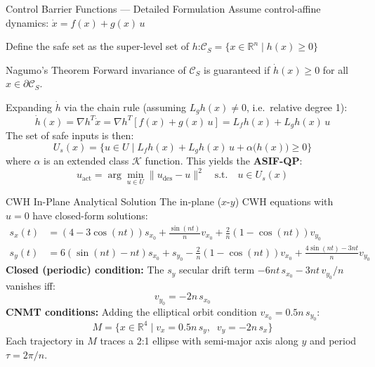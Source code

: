 \begin{frame}{Control Barrier Functions --- Detailed Formulation}
  \hypertarget{backup:cbf-detail}{}
  \small
  Assume control-affine dynamics: $\dot{x} = f(x) + g(x)\,u$

  \vskip4pt
  Define the safe set as the super-level set of $h$:\quad $\mathcal{C}_S = \{x \in \mathbb{R}^n \mid h(x) \geq 0\}$

  \vskip4pt
  \begin{block}{Nagumo's Theorem}
    \vspace{2pt}
    Forward invariance of $\mathcal{C}_S$ is guaranteed if $\dot{h}(x) \geq 0$ for all $x \in \partial\mathcal{C}_S$.
    \vspace{2pt}
  \end{block}

  \vskip4pt
  Expanding $\dot{h}$ via the chain rule (assuming $L_g h(x) \neq 0$, i.e.\ relative degree 1):
  \vskip-6pt
  \[ \dot{h}(x) = \nabla h^T \dot{x} = \nabla h^T [f(x) + g(x)\,u] = L_f h(x) + L_g h(x)\, u \]
  \vskip0pt
  The set of safe inputs is then:
  \vskip-6pt
  \[ U_s(x) = \{u \in U \mid L_f h(x) + L_g h(x)\, u + \alpha\big(h(x)\big) \geq 0\} \]
  \vskip0pt
  where $\alpha$ is an extended class $\mathcal{K}$ function. This yields the \textbf{ASIF-QP}:
  \vskip-6pt
  \[ u_{\text{act}} = \arg\min_{u \in U} \| u_{\text{des}} - u \|^2 \quad \text{s.t.} \quad u \in U_s(x) \]

\end{frame}

\begin{frame}{CWH In-Plane Analytical Solution}
  \hypertarget{backup:cwh-solution}{}
  \footnotesize
  The in-plane ($x$-$y$) CWH equations with $u = 0$ have closed-form solutions:
  \vskip-4pt
  \scriptsize
  \begin{align*}
    s_x(t) &= \left(4 - 3\cos(nt)\right) s_{x_0} + \frac{\sin(nt)}{n} v_{x_0} + \frac{2}{n}\left(1 - \cos(nt)\right) v_{y_0} \\
    s_y(t) &= 6\left(\sin(nt) - nt\right) s_{x_0} + s_{y_0} - \frac{2}{n}\left(1 - \cos(nt)\right) v_{x_0} + \frac{4\sin(nt) - 3nt}{n} v_{y_0}
  \end{align*}
  \vskip0pt
  \footnotesize
  \textbf{Closed (periodic) condition:} The $s_y$ secular drift term $-6nt\, s_{x_0} - 3nt\, v_{y_0}/n$ vanishes iff:
  \vskip-6pt
  \[ v_{y_0} = -2n\, s_{x_0} \]
  \vskip0pt
  \textbf{CNMT conditions:} Adding the elliptical orbit condition $v_{x_0} = 0.5n\, s_{y_0}$:
  \vskip-6pt
  \[ M = \{x \in \mathbb{R}^4 \mid v_x = 0.5n\, s_y,\;\; v_y = -2n\, s_x\} \]
  \vskip0pt
  Each trajectory in $M$ traces a 2:1 ellipse with semi-major axis along $y$ and period $\tau = 2\pi/n$.
\end{frame}

